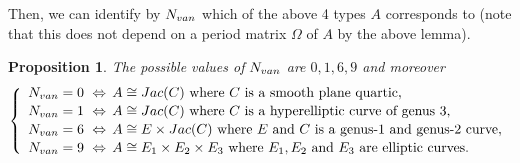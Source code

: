 \documentclass{amsart}
\theoremstyle{definition}
\theoremstyle{plain}
\newtheorem{Prop}[Def]{Proposition}
\begin{document}
Then, we can identify by $N_{\rm van}$ which of the above 4 types $A$ corresponds to (note that this does not depend on a period matrix $\varOmega$ of $A$ by the above lemma).
\begin{Prop}\label{van_num}
The possible values of $N_{\rm van}$ are $0,1,6,9$ and moreover\vspace{0.5mm}
\[
    \left\{
        \begin{array}{l}
        N_{\rm van} =0\ \Leftrightarrow\,A \cong {\rm Jac}(C)\ \text{where}\ C\ \text{is\ a\ smooth\ plane\ quartic},\\[0.5mm]
        N_{\rm van} =1\ \Leftrightarrow\,A \cong {\rm Jac}(C)\ \text{where}\ C\ \text{is\ a\ hyperelliptic\ curve\ of\ genus\ } 3,\\[0.5mm]
        N_{\rm van} =6\ \Leftrightarrow\,A \cong E \times {\rm Jac}(C)\ \text{where}\ E\ \text{and}\ C\text{\ is\ a genus-1 and genus-2 curve},\\[0.5mm]
        N_{\rm van} =9\ \Leftrightarrow\,A \cong E_1 \times E_2 \times E_3\ \text{where}\ E_1,E_2 \text{\ and\ } E_3 \text{\ are\ elliptic\ curves}.
        \end{array}
    \right.
\]
\end{Prop}
\end{document}
